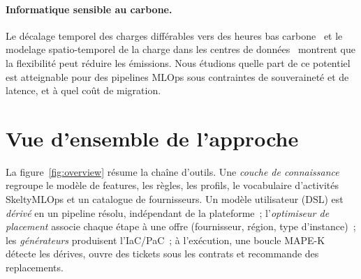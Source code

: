\documentclass[10pt,a4paper]{article}
\begin{document}
\paragraph{Informatique sensible au carbone.} Le décalage temporel des charges
différables vers des heures bas carbone~\cite{wiesner2021} et le modelage
spatio-temporel de la charge dans les centres de données~\cite{radovanovic2023}
montrent que la flexibilité peut réduire les émissions. Nous étudions quelle part de
ce potentiel est atteignable pour des pipelines MLOps sous contraintes de
souveraineté et de latence, et à quel coût de migration.

\section{Vue d'ensemble de l'approche}
La figure~\ref{fig:overview} résume la chaîne d'outils. Une \emph{couche de
connaissance} regroupe le modèle de features, les règles, les profils, le vocabulaire
d'activités SkeltyMLOps et un catalogue de fournisseurs. Un modèle utilisateur (DSL)
est \emph{dérivé} en un pipeline résolu, indépendant de la plateforme~;
l'\emph{optimiseur de placement} associe chaque étape à une offre (fournisseur,
région, type d'instance)~; les \emph{générateurs} produisent l'IaC/PaC~; à
l'exécution, une boucle MAPE-K~\cite{kephart2003} détecte les dérives, ouvre des
tickets sous les contrats et recommande des replacements.
\end{document}
